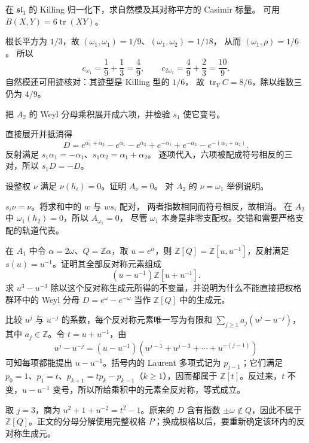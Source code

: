\begin{exercise}\label{b5:ex:19-sl3-casimir-values}
	在 \(\mathfrak{sl}_3\) 的 Killing 归一化下，求自然模及其对称平方的 Casimir 标量。 可用 \(B(X,Y)=6\operatorname{tr}(XY)\)。
\end{exercise}
\begin{solution}
	根长平方为 \(1/3\)，故 \((\omega_1,\omega_1)=1/9\)、\((\omega_1,\omega_2)=1/18\)， 从而 \((\omega_1,\rho)=1/6\)。 所以
	\[
		c_{\omega_1}=\frac19+\frac13=\frac49,\qquad c_{2\omega_1}=\frac49+\frac23=\frac{10}{9}.
	\]
	自然模还可用迹核对：其迹型是 Killing 型的 \(1/6\)， 故 \(\operatorname{tr}_V C=8/6\)，除以维数三仍为 \(4/9\)。
\end{solution}

\begin{exercise}\label{b5:ex:19-a2-denominator}
	把 \(A_2\) 的 Weyl 分母乘积展开成六项，并检验 \(s_1\) 使它变号。
\end{exercise}
\begin{solution}
	直接展开并抵消得
	\[
		D=e^{\alpha_1+\alpha_2}-e^{\alpha_1}-e^{\alpha_2} +e^{-\alpha_1}+e^{-\alpha_2}-e^{-(\alpha_1+\alpha_2)}.
	\]
	反射满足 \(s_1\alpha_1=-\alpha_1\)、\(s_1\alpha_2=\alpha_1+\alpha_2\)。 逐项代入，六项被配成符号相反的三对，所以 \(s_1D=-D\)。
\end{solution}

\begin{exercise}\label{b5:ex:19-singular-alternant}
	设整权 \(\nu\) 满足 \(\nu(h_i)=0\)。证明 \(A_\nu=0\)。 对 \(A_2\) 的 \(\nu=\omega_1\) 举例说明。
\end{exercise}
\begin{solution}
	\(s_i\nu=\nu\)。将求和中的 \(w\) 与 \(ws_i\) 配对， 两者指数相同而符号相反，故相消。 在 \(A_2\) 中 \(\omega_1(h_2)=0\)，所以 \(A_{\omega_1}=0\)， 尽管 \(\omega_1\) 本身是非零支配权。交错和需要严格支配的轨道代表。
\end{solution}

\begin{exercise}\label{b5:ex:19-anti-invariant-module}
	在 \(A_1\) 中令 \(\alpha=2\omega\)、\(Q=\mathbb Z\alpha\)，取 \(u=e^\alpha\)，则 \(\mathbb Z[Q]=\mathbb Z[u,u^{-1}]\)，反射满足 \(s(u)=u^{-1}\)。证明其全部反对称元素组成
	\[
		(u-u^{-1})\mathbb Z[u+u^{-1}].
	\]
	求 \(u^3-u^{-3}\) 除以这个反对称生成元所得的不变量，并说明为什么不能直接把权格群环中的 Weyl 分母 \(D=e^\omega-e^{-\omega}\) 当作 \(\mathbb Z[Q]\) 中的生成元。
\end{exercise}
\begin{solution}
	比较 \(u^j\) 与 \(u^{-j}\) 的系数，每个反对称元素唯一写为有限和 \(\sum_{j\ge1}a_j(u^j-u^{-j})\)，其中 \(a_j\in\mathbb Z\)。令 \(t=u+u^{-1}\)，由
	\[
		u^j-u^{-j}=(u-u^{-1})(u^{j-1}+u^{j-3}+\cdots+u^{-(j-1)})
	\]
	可知每项都能提出 \(u-u^{-1}\)。括号内的 Laurent 多项式记为 \(p_{j-1}\)；它们满足 \(p_0=1\)、\(p_1=t\)、\(p_{k+1}=tp_k-p_{k-1}\)（\(k\ge1\)），因而都属于 \(\mathbb Z[t]\)。反过来，\(t\) 不变，\(u-u^{-1}\) 变号，所以所给乘积中的元素全反对称，等式成立。

	取 \(j=3\)，商为 \(u^2+1+u^{-2}=t^2-1\)。原来的 \(D\) 含有指数 \(\pm\omega\notin Q\)，因此不属于 \(\mathbb Z[Q]\)。正文的分母分解使用完整权格 \(P\)；换成根格以后，要重新确定该环内的反对称生成元。
\end{solution}

